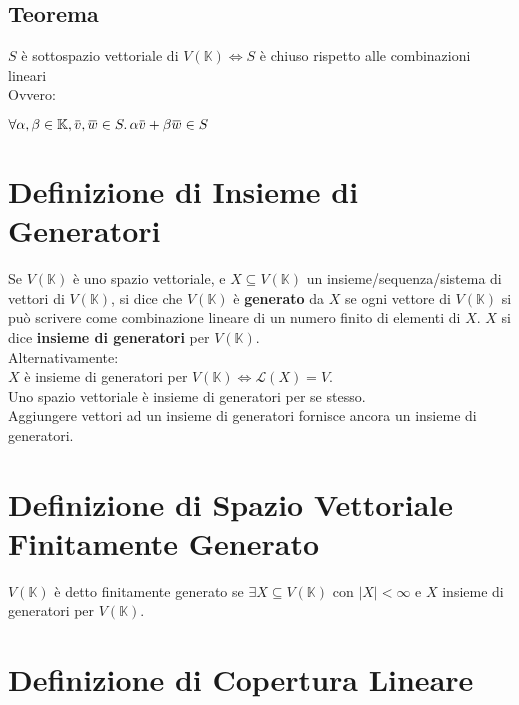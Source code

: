 \documentclass[a4paper, twoside, italian, 11pt]{book}
\newcommand{\card}[1] {\left | #1 \right |}
\newcommand{\overbar}[1] {\mkern 1.5mu\overline{\mkern-1.5mu#1\mkern-1.5mu}\mkern 1.5mu}
\newcommand{\K}{\mathbb K}
\begin{document}
\subsection{Teorema}

\noindent
$S$ è sottospazio vettoriale di $V(\K) \iff S$ è chiuso rispetto alle combinazioni lineari \\

\noindent
Ovvero:

$\forall \alpha, \beta \in \K, \overbar v, \overbar w \in S \ldotp \alpha \overbar v + \beta \overbar w \in S$




\section{Definizione di Insieme di Generatori}

Se $V(\K)$ è uno spazio vettoriale, e $X \subseteq V(\K)$ un insieme/sequenza/sistema di vettori di $V(\K)$, si dice che $V(\K)$ è \textbf{generato} da $X$ se ogni vettore di $V(\K)$ si può scrivere come combinazione lineare di un numero finito di elementi di $X$. $X$ si dice \textbf{insieme di generatori} per $V(\K)$. \\

\noindent
Alternativamente: \\
$X$ è insieme di generatori per $V(\K) \iff \mathcal L(X) = V$. \\

\noindent
Uno spazio vettoriale è insieme di generatori per se stesso. \\
Aggiungere vettori ad un insieme di generatori fornisce ancora un insieme di generatori.




\section{Definizione di Spazio Vettoriale Finitamente Generato}

$V(\K)$ è detto finitamente generato se $\exists X \subseteq V(\K)$ con $\card X < \infty$ e $X$ insieme di generatori per $V(\K)$.



\section{Definizione di Copertura Lineare}
\end{document}
